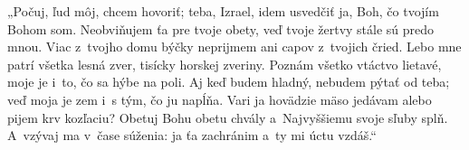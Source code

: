 „Počuj, ľud môj, chcem hovoriť;
teba, Izrael, idem usvedčiť
ja, Boh, čo tvojím Bohom som.
\versseparator
Neobviňujem ťa pre tvoje obety,
veď tvoje žertvy stále sú predo mnou.
\versseparator
Viac z~tvojho domu býčky neprijmem
ani capov z~tvojich čried.
\versseparator
Lebo mne patrí všetka lesná zver,
tisícky horskej zveriny.
\versseparator
Poznám všetko vtáctvo lietavé,
moje je i~to, čo sa hýbe na poli.
\versseparator
Aj keď budem hladný, nebudem pýtať od teba;
veď moja je zem i~s tým, čo ju napĺňa.
\versseparator
Vari ja hovädzie mäso jedávam
alebo pijem krv kozľaciu?
\versseparator
Obetuj Bohu obetu chvály
a~Najvyššiemu svoje sľuby splň.
\versseparator
A~vzývaj ma v~čase súženia:
ja ťa zachránim a~ty mi úctu vzdáš.“